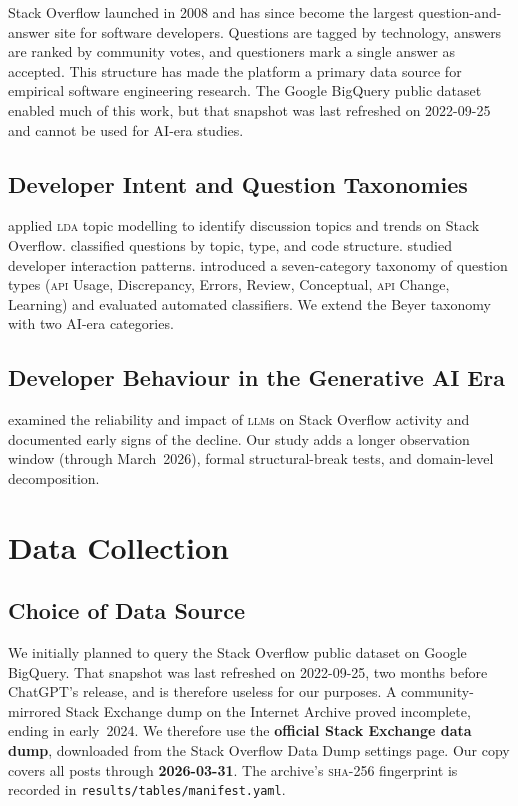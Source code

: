 \documentclass[sigconf]{acmart}
\begin{document}
Stack Overflow launched in 2008 and has since become
the largest question-and-answer site
for software developers.
Questions are tagged by technology,
answers are ranked by community votes,
and questioners mark a single answer as accepted.
This structure has made the platform
a primary data source
for empirical software engineering research.
The Google BigQuery public
dataset~\cite{stackoverflowbigquery2016}
enabled much of this work,
but that snapshot was last refreshed
on 2022-09-25
and cannot be used for AI-era studies.

\subsection{Developer Intent and
Question Taxonomies}

\citet{barua2014developers} applied \textsc{lda}
topic modelling to identify discussion topics
and trends on Stack Overflow.
\citet{allamanis2013and} classified questions
by topic, type, and code structure.
\citet{wang2013empirical} studied
developer interaction patterns.
\citet{beyer2020kind} introduced
a seven-category taxonomy of question types
(\textsc{api} Usage, Discrepancy, Errors,
Review, Conceptual, \textsc{api} Change, Learning)
and evaluated automated classifiers.
We extend the Beyer taxonomy
with two AI-era categories.

\subsection{Developer Behaviour
in the Generative AI Era}

\citet{dasilva2025llms}
examined the reliability and impact of \textsc{llm}s
on Stack Overflow activity
and documented early signs of the decline.
Our study adds a longer observation window
(through March~2026),
formal structural-break tests,
and domain-level decomposition.

\section{Data Collection}
\label{sec:data}

\subsection{Choice of Data Source}

We initially planned to query the Stack Overflow
public dataset on Google BigQuery.
That snapshot was last refreshed on 2022-09-25,
two months before ChatGPT's release,
and is therefore useless for our purposes.
A community-mirrored Stack Exchange dump
on the Internet Archive proved incomplete,
ending in early~2024.
We therefore use the \textbf{official
Stack Exchange data dump},
downloaded from the Stack Overflow
Data Dump settings page.
Our copy covers all posts
through \textbf{2026-03-31}.
The archive's \textsc{sha}-256 fingerprint
is recorded in
\texttt{results/tables/manifest.yaml}.
\end{document}
